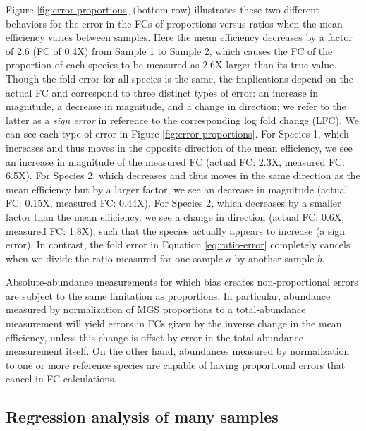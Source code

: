 \documentclass[
]{article}
\begin{document}
Figure \ref{fig:error-proportions} (bottom row) illustrates these two different behaviors for the error in the FCs of proportions versus ratios when the mean efficiency varies between samples.
Here the mean efficiency decreases by a factor of 2.6 (FC of 0.4X) from Sample 1 to Sample 2, which causes the FC of the proportion of each species to be measured as 2.6X larger than its true value.
Though the fold error for all species is the same, the implications depend on the actual FC and correspond to three distinct types of error: an increase in magnitude, a decrease in magnitude, and a change in direction; we refer to the latter as a \emph{sign error} in reference to the corresponding log fold change (LFC).
We can see each type of error in Figure \ref{fig:error-proportions}.
For Species 1, which increases and thus moves in the opposite direction of the mean efficiency, we see an increase in magnitude of the measured FC (actual FC: 2.3X, measured FC: 6.5X).
For Species 2, which decreases and thus moves in the same direction as the mean efficiency but by a larger factor, we see an decrease in magnitude (actual FC: 0.15X, measured FC: 0.44X).
For Species 2, which decreases by a smaller factor than the mean efficiency, we see a change in direction (actual FC: 0.6X, measured FC: 1.8X), such that the species actually appears to increase (a sign error).
In contrast, the fold error in Equation \eqref{eq:ratio-error} completely cancels when we divide the ratio measured for one sample \(a\) by another sample \(b\).

Absolute-abundance measurements for which bias creates non-proportional errors are subject to the same limitation as proportions.
In particular, abundance measured by normalization of MGS proportions to a total-abundance measurement will yield errors in FCs given by the inverse change in the mean efficiency, unless this change is offset by error in the total-abundance measurement itself.
On the other hand, abundances measured by normalization to one or more reference species are capable of having proportional errors that cancel in FC calculations.

\hypertarget{regression-analysis-of-many-samples}{%
\subsection{Regression analysis of many samples}\label{regression-analysis-of-many-samples}}
\end{document}
